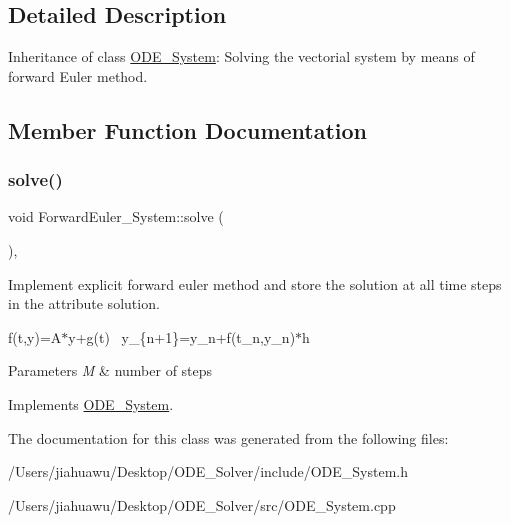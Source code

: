 \subsection{Detailed Description}
Inheritance of class \mbox{\hyperlink{class_o_d_e___system}{O\+D\+E\+\_\+\+System}}\+: Solving the vectorial system by means of forward Euler method. 

\subsection{Member Function Documentation}
\mbox{\label{class_forward_euler___system_a336f60f3804df3323a4729f9ff380b65}} 
\subsubsection{\texorpdfstring{solve()}{solve()}}
{\footnotesize\ttfamily void Forward\+Euler\+\_\+\+System\+::solve (\begin{DoxyParamCaption}{ }\end{DoxyParamCaption})\hspace{0.3cm}{\ttfamily [override]}, {\ttfamily [virtual]}}



Implement explicit forward euler method and store the solution at all time steps in the attribute solution. 

f(t,y)=A$\ast$y+g(t)~\newline
y\+\_\+\{n+1\}=y\+\_\+n+f(t\+\_\+n,y\+\_\+n)$\ast$h ~\newline

\begin{DoxyParams}{Parameters}
{\em M} & number of steps \\
\hline
\end{DoxyParams}


Implements \mbox{\hyperlink{class_o_d_e___system_a78a058382148b745fa458f0b9f52f47c}{O\+D\+E\+\_\+\+System}}.



The documentation for this class was generated from the following files\+:\begin{DoxyCompactItemize}
\item 
/\+Users/jiahuawu/\+Desktop/\+O\+D\+E\+\_\+\+Solver/include/O\+D\+E\+\_\+\+System.\+h\item 
/\+Users/jiahuawu/\+Desktop/\+O\+D\+E\+\_\+\+Solver/src/O\+D\+E\+\_\+\+System.\+cpp\end{DoxyCompactItemize}
